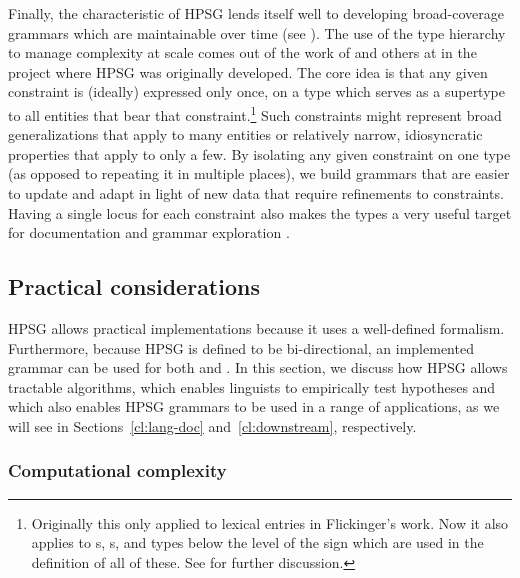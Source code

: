 \documentclass[output=paper
                ,modfonts
                ,nonflat
	        ,collection
	        ,collectionchapter
	        ,collectiontoclongg
 	        ,biblatex
                ,babelshorthands
                ,newtxmath
                ,draftmode
                ,colorlinks, citecolor=brown
]{./langsci/langscibook}
\begin{document}
Finally, the  characteristic of HPSG lends itself well to developing broad-coverage grammars which are maintainable over time (see \citealt{Syg:Win:11}). The use of the type hierarchy to manage complexity at scale comes out of the work of \citet{Flickinger87} and others at  in the project where HPSG was originally developed. The core idea is that any given constraint is (ideally) expressed only once, on a type which serves as a supertype to all entities that bear that constraint.\footnote{Originally this only applied to lexical entries in Flickinger's work. Now it also applies to s, s, and types below the level of the sign which are used in the definition of all of these. See  for further discussion.} Such constraints might represent broad generalizations that apply to many entities or relatively narrow, idiosyncratic properties that apply to only a few. By isolating any given constraint on one type (as opposed to repeating it in multiple places), we build grammars that are easier to update and adapt in light of new data that require refinements to constraints. Having a single locus for each constraint also makes the types a very useful target for documentation \citep{Hashimoto-etal:07} and grammar exploration \citep{Letcher:18}. 


\subsection{Practical considerations}
\label{cl:prac}

HPSG allows practical implementations
because it uses a well-defined formalism.
Furthermore, because HPSG is defined to be bi-directional,
an implemented grammar can be used for both  and .
In this section, we discuss how HPSG allows tractable algorithms,
which enables linguists to empirically test hypotheses
and which also enables HPSG grammars to be used in a range of applications,
as we will see in Sections~\ref{cl:lang-doc} and~\ref{cl:downstream}, respectively.

\subsubsection{Computational complexity}
\label{cl:prac:comp}

\end{document}
